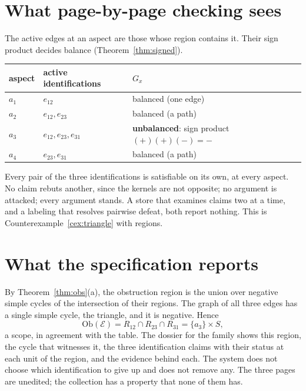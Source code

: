 \section{What page-by-page checking sees}\label{sec:case1pages}

The active edges at an aspect are those whose region contains it. Their sign product decides balance (Theorem~\ref{thm:signed}).

\begin{center}
\small
\begin{tabular}{@{}l l l@{}}
\toprule
aspect & active identifications & $G_x$\\
\midrule
$a_1$ & $e_{12}$ & balanced (one edge)\\
$a_2$ & $e_{12},e_{23}$ & balanced (a path)\\
$a_3$ & $e_{12},e_{23},e_{31}$ & \textbf{unbalanced}: sign product $(+)(+)(-)=-$\\
$a_4$ & $e_{23},e_{31}$ & balanced (a path)\\
\bottomrule
\end{tabular}
\end{center}

Every pair of the three identifications is satisfiable on its own, at every aspect. No claim rebuts another, since the kernels are not opposite; no argument is attacked; every argument stands. A store that examines claims two at a time, and a labeling that resolves pairwise defeat, both report nothing. This is Counterexample~\ref{cex:triangle} with regions.

\section{What the specification reports}\label{sec:case1report}

By Theorem~\ref{thm:obs}(a), the obstruction region is the union over negative simple cycles of the intersection of their regions. The graph of all three edges has a single simple cycle, the triangle, and it is negative. Hence
\[
\mathrm{Ob}(\mathcal E)=R_{12}\cap R_{23}\cap R_{31}=\{a_3\}\times S,
\]
a scope, in agreement with the table. The dossier for the family shows this region, the cycle that witnesses it, the three identification claims with their status at each unit of the region, and the evidence behind each. The system does not choose which identification to give up and does not remove any. The three pages are unedited; the collection has a property that none of them has.

